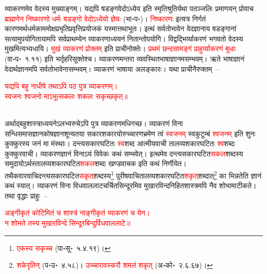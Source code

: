 \begin{sloppypar}\justifying\noindent\hspace{10mm} व्याकरणमेव वेदस्य मुख्याङ्गम्। यद्यपि षडङ्गवेदोऽध्येय इति स्मृति\-श्रुतिर्यथा पतञ्जलिः प्रमाणयन् प्रोवाच \textcolor{red}{ब्राह्मणेन निष्कारणो धर्मः षडङ्गो वेदोऽध्येयो ज्ञेयः} (भा॰प॰)। \textcolor{red}{निष्कारणः} इत्यत्र निर्गतं कारणमर्थ\-धर्म\-काम\-मोक्ष\-प्रभृति\-प्रवृत्ति\-प्रयोजकं यस्मात्तथा\-भूतः। इत्थं सर्वतो\-भावेन वेद\-ज्ञानाय षडङ्गानां सत्यामुपयोगितायामपि सर्व\-प्राथम्येन व्याकरणाध्ययनं नितान्तोपयोगि। विद्वद्भिर्व्याकरणं भगवतो वेदस्य मुखमित्यभ्य\-धायि। \textcolor{red}{मुखं व्याकरणं प्रोक्तम्} इति प्राचीनोक्तेः।
\textcolor{red}{प्रथमं छन्दसामङ्गं प्राहुर्व्याकरणं बुधाः} (वा॰प॰~१.११) इति भर्तृहरि\-सूक्तेश्च। व्याकरणमन्तरा व्यवस्थित\-भाषा\-ज्ञानमसम्भवम्। ऋते भाषा\-ज्ञानं वेदार्थ\-ज्ञानमपि सर्वतो\-भावेनासम्भवम्। व्याकरणं भाषाया अलङ्कारः। यथा प्राचीनैरुक्तम्~–\end{sloppypar}
\centering\textcolor{red}{यद्यपि बहु नाधीषे तथाऽपि पठ पुत्र व्याकरणम्। \nopagebreak\\
स्वजनः श्वजनो माऽभूत्सकलः शकलः सकृच्छकृत्॥}\nopagebreak\\
\\
\begin{sloppypar}\justifying\noindent अर्थाद्बहु\-शास्त्राध्ययनेऽलभ्य\-रुचेऽपि पुत्र व्याकरणमधिगच्छ। व्याकरणं विना सन्धि\-समास\-ज्ञान\-कोष\-ज्ञान\-शून्यतया सकार\-शकारयोरुच्चारण\-भ्रमेण त्वं \textcolor{red}{स्व\-जनम्} स्व\-कुटुम्बं \textcolor{red}{श्वजनम्} इति शुनः कुक्कुरस्य जनं
मा मंस्थाः। दन्त्य\-सकार\-घटितः \textcolor{red}{स्व}\-शब्द आत्मीय\-वाची तालव्य\-शकार\-घटितः \textcolor{red}{श्व}\-शब्दः कुक्कुरवाची। व्याकरण\-ज्ञानं विनाऽयं विवेकः कथं सम्भवेत्। इत्थमेव दन्त्य\-सकार\-घटित\-\textcolor{red}{सकल}\-शब्दस्य समुदायोऽर्थस्तालव्य\-शकार\-घटित\-\textcolor{red}{शकल}\-शब्दः खण्ड\-वाचक इति कथं निर्णीयेत। तथैकवार\-वाचि\-दन्त्य\-सकार\-घटित\-\textcolor{red}{सकृत्‌}\-शब्दस्य\footnote{\textcolor{red}{एकस्य सकृच्च} (पा॰सू॰~५.४.१९)।} पुरीष\-वाचि\-तालव्य\-शकार\-घटित\-\textcolor{red}{शकृत्‌}\-शब्दात्\footnote{\textcolor{red}{शकेरृतिन्} (प॰उ॰~४.५८)। \textcolor{red}{उच्चारावस्करौ शमलं शकृत्} (अ॰को॰~२.६.६७)।} का भिन्नतेति ज्ञानं कथं स्यात्। व्याकरणं विना विधवा\-ललाट\-चर्चित\-सिन्दूरमिव मुखारविन्द\-निहित\-शास्त्रमपि नैव शोभामाटीकते। तथा वृद्धाः प्राहुः~–\end{sloppypar}
\centering\textcolor{red}{अङ्गीकृतं कोटिमितं च शास्त्रं नाङ्गीकृतं व्याकरणं च येन। \nopagebreak\\
न शोभते तस्य मुखारविन्दे सिन्दूरबिन्दुर्विधवाललाटे॥}\nopagebreak\\
